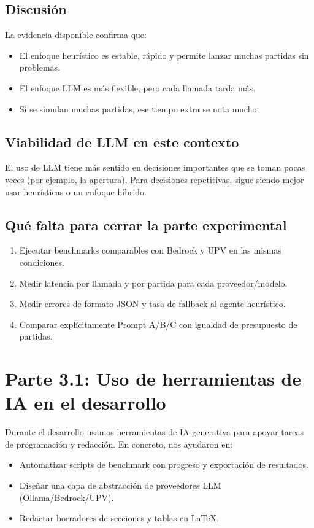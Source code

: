 \documentclass[11pt,spanish,listoffigures,listoftables]{tfgetsinf}
\begin{document}
\section{Discusión}
La evidencia disponible confirma que:
\begin{itemize}
  \item El enfoque heurístico es estable, rápido y permite lanzar muchas partidas sin problemas.
  \item El enfoque LLM es más flexible, pero cada llamada tarda más.
  \item Si se simulan muchas partidas, ese tiempo extra se nota mucho.
\end{itemize}

\section{Viabilidad de LLM en este contexto}
El uso de LLM tiene más sentido en decisiones importantes que se toman pocas veces (por ejemplo, la apertura). Para decisiones repetitivas, sigue siendo mejor usar heurísticas o un enfoque híbrido.

\section{Qué falta para cerrar la parte experimental}
\begin{enumerate}
  \item Ejecutar benchmarks comparables con Bedrock y UPV en las mismas condiciones.
  \item Medir latencia por llamada y por partida para cada proveedor/modelo.
  \item Medir errores de formato JSON y tasa de fallback al agente heurístico.
  \item Comparar explícitamente Prompt A/B/C con igualdad de presupuesto de partidas.
\end{enumerate}

\chapter{Parte 3.1: Uso de herramientas de IA en el desarrollo}

Durante el desarrollo usamos herramientas de IA generativa para apoyar tareas de programación y redacción. En concreto, nos ayudaron en:
\begin{itemize}
  \item Automatizar scripts de benchmark con progreso y exportación de resultados.
  \item Diseñar una capa de abstracción de proveedores LLM (Ollama/Bedrock/UPV).
  \item Redactar borradores de secciones y tablas en LaTeX.
\end{itemize}
\end{document}

